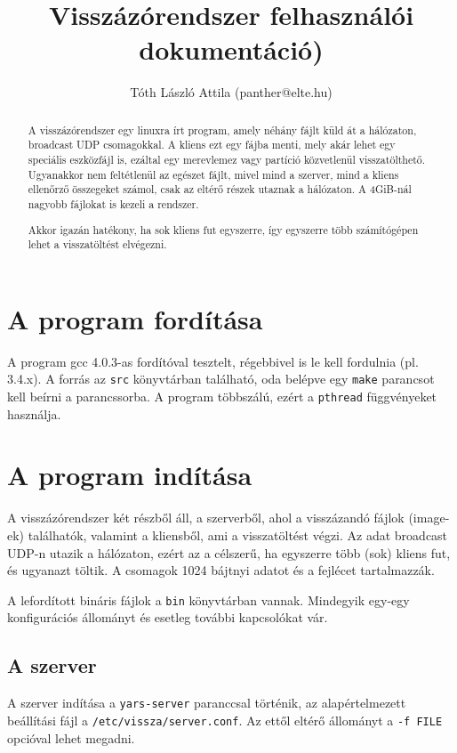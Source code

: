 \documentclass[fleqn,10pt,a4paper,titlepage]{article}
\title{Visszázórendszer felhasználói dokumentáció)}
\author{Tóth László Attila (panther@elte.hu)}
\date{}
\begin{document}
  \maketitle
  \mktoc

  \begin{abstract}
    A visszázórendszer egy linuxra írt program, amely néhány fájlt küld át a hálózaton, broadcast UDP csomagokkal. A
    kliens ezt egy fájba menti, mely akár lehet egy speciális eszközfájl is, ezáltal egy merevlemez vagy partíció
    közvetlenül visszatölthető. Ugyanakkor nem feltétlenül az egészet fájlt, mivel mind a szerver, mind a kliens
    ellenőrző összegeket számol, csak az eltérő részek utaznak a hálózaton. A 4GiB-nál nagyobb fájlokat is kezeli a
    rendszer.
    
    Akkor igazán hatékony, ha sok kliens fut egyszerre, így egyszerre több számítógépen lehet a visszatöltést elvégezni.
  \end{abstract}
  
  \section{A program fordítása}
  A program gcc 4.0.3-as fordítóval tesztelt, régebbivel is le kell fordulnia (pl. 3.4.x). A forrás az \texttt{src}
  könyvtárban található, oda belépve egy \texttt{make} parancsot kell beírni a parancssorba. A program többszálú, ezért
  a \texttt{pthread} függvényeket használja.

  \section{A program indítása}
  A visszázórendszer két részből áll, a szerverből, ahol a visszázandó fájlok (image-ek) találhatók, valamint a
  kliensből, ami a visszatöltést végzi. Az adat broadcast UDP-n utazik a hálózaton, ezért az a célszerű, ha egyszerre
  több (sok) kliens fut, és ugyanazt töltik. A csomagok 1024 bájtnyi adatot és a fejlécet tartalmazzák.

  A lefordított bináris fájlok a \texttt{bin} könyvtárban vannak. Mindegyik egy-egy konfigurációs állományt és esetleg
  további kapcsolókat vár.

  \subsection{A szerver}
  A szerver indítása a \texttt{yars-server} paranccsal történik, az alapértelmezett beállítási fájl a
  \texttt{/etc/vissza/server.conf}. Az ettől eltérő állományt a \texttt{-f FILE} opcióval lehet megadni.
  
\end{document}

